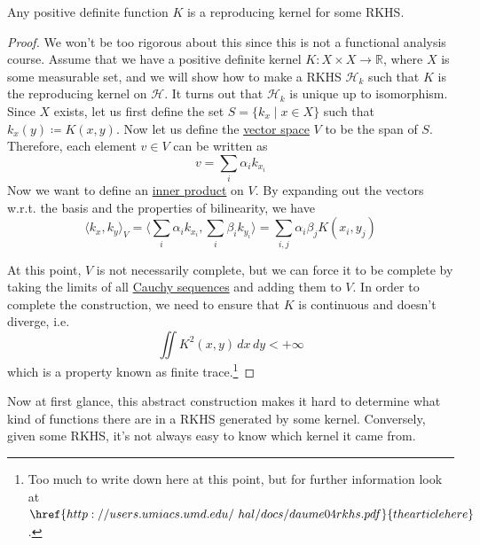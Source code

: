   \begin{theorem}
    \label{thm:moore-aronszajn}
 
    Any positive definite function $K$ is a reproducing kernel for some RKHS.  
  \end{theorem} 
  \begin{proof} 
    We won't be too rigorous about this since this is not a functional analysis course. Assume that we have a positive definite kernel $K: X \times X \rightarrow \mathbb{R}$, where $X$ is some measurable set, and we will show how to make a RKHS $\mathcal{H}_k$ such that $K$ is the reproducing kernel on $\mathcal{H}$. It turns out that $\mathcal{H}_k$ is unique up to isomorphism. Since $X$ exists, let us first define the set $S = \{ k_x \mid x \in X\}$ such that $k_x (y) \coloneqq K(x, y)$. Now let us define the \hyperref[lin-def:vector-space]{vector space} $V$ to be the span of $S$. Therefore, each element $v \in V$ can be written as 
    \begin{equation}
      v = \sum_i \alpha_i k_{x_i}
    \end{equation}
    Now we want to define an \hyperref[lin-def:inner-product]{inner product} on $V$. By expanding out the vectors w.r.t. the basis and the properties of bilinearity, we have 
    \begin{equation}
      \langle k_x, k_y \rangle_{V} = \bigg\langle \sum_i \alpha_i k_{x_i} , \sum_i \beta_i k_{y_i} \bigg\rangle = \sum_{i, j} \alpha_i \beta_j K(x_i, y_j)
    \end{equation}
     
    At this point, $V$ is not necessarily complete, but we can force it to be complete by taking the limits of all \hyperref[real-def:cauchy-sequence]{Cauchy sequences} and adding them to $V$. In order to complete the construction, we need to ensure that $K$ is continuous and doesn't diverge, i.e. 
    \begin{equation}
      \iint K^2 (x, y) \,dx\,dy < +\infty
    \end{equation}
    which is a property known as finite trace.\footnote{Too much to write down here at this point, but for further information look at $\href{http://users.umiacs.umd.edu/~hal/docs/daume04rkhs.pdf}{the article here}$.}
  \end{proof}

  Now at first glance, this abstract construction makes it hard to determine what kind of functions there are in a RKHS generated by some kernel. Conversely, given some RKHS, it's not always easy to know which kernel it came from. 

